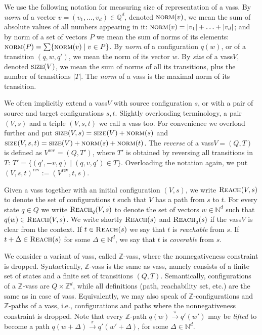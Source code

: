 \documentclass[a4paper, UKenglish, cleveref, autoref, thm-restate]{lipics-v2021}
\newcommand{\N}{\mathbb{N}}
\newcommand{\Z}{\mathbb{Z}}
\newcommand{\Q}{\mathbb{Q}}
\newcommand{\set}[1]{\{#1\}}
\newcommand{\setof}[2]{\set{#1 \mid #2}}
\newcommand{\card}[1]{\left|#1\right|}
\newcommand{\reach}{\textsc{Reach}}
\newcommand{\trans}[1]{\stackrel{#1}{\longrightarrow}}
\newcommand{\norm}{\textsc{norm}}
\newcommand{\size}{\textsc{size}}
\newcommand{\vass}{{\sc vass}\xspace}
\newcommand{\zvass}{$\Z$-{\sc vass}\xspace}
\newcommand{\rev}[1]{{#1}^{\text{rev}}}
\newcommand{\absv}[1]{|#1|}
\begin{document}
We use the following notation for measuring size of representation of a \vass.
By \emph{norm} of a vector $v=(v_1, \ldots, v_d) \in \Q^d$, denoted $\norm(v)$, 
we mean the sum of absolute values of all numbers appearing in it:
$\norm(v) = \absv{v_1} + \ldots + \absv{v_d}$; and 
by norm of a set of vectors $P$ we mean the sum of norms of its elements:
$\norm(P) = \sum\setof{\norm(v)}{v\in P}$. 
By \emph{norm} of a configuration $q(w)$, or of a transition $(q, w, q')$,
we mean the norm of its vector $w$.
By \emph{size} of a \vass $V$, denoted $\size(V)$, we mean
the sum of norms of all its transitions, 
plus the number of transitions $\card T$.
The \emph{norm} of a \vass is the maximal norm of its transition.


We often implicitly extend a \vass $V$ with source configuration $s$, or with
a pair of source and target configurations $s, t$.
Slightly overloading terminology, a pair $(V, s)$ and a triple $(V, s, t)$ we call a \vass too.
For convenience we overload further and put $\size(V,s) = \size(V) + \norm(s)$ and 
$\size(V, s, t) = \size(V) + \norm(s) + \norm(t)$.
The \emph{reverse} of a \vass $V = (Q, T)$ is defined as $\rev V = (Q, T')$,
where $T'$ is obtained by reversing all transitions in $T$:
$T' = \setof{(q', -v, q)}{(q,v,q')\in T}$.
Overloading the notation again, we put $\rev{(V, s, t)} := (\rev V, t, s)$.

Given a \vass together with an initial configuration $(V, s)$, we write 
$\reach(V,s)$ to denote the set of configurations $t$ such that $V$ has a path from $s$ to $t$.
For every state $q\in Q$ we write $\reach_q(V,s)$ to denote the
set of vectors $w\in\N^d$ such that $q(w) \in \reach(V,s)$.
We write shortly $\reach(s)$ and $\reach_q(s)$ if the \vass $V$
is clear from the context.
If $t\in\reach(s)$ we say that $t$ is \emph{reachable} from $s$.
If $t+\Delta\in\reach(s)$ for some $\Delta\in\N^d$, we say that $t$ is \emph{coverable} from $s$.

We consider a variant of \vass, called \zvass, where the nonnegativeness constraint is dropped.
Syntactically, \zvass is the same as \vass, namely consists of a finite set of states and a finite set of transitions
$(Q, T)$. 
Semantically, configurations of a \zvass are $Q \times \Z^d$, while
all definitions (path, reachability set, etc.) are the same as in case of \vass.
Equivalently, we may also speak of $\Z$-configurations and $\Z$-paths of a \vass, i.e., 
configurations and paths where the nonnegativeness constraint is dropped.
Note that every $\Z$-path $q(w) \trans{\pi} q'(w')$ may be \emph{lifted} to become a path
$q(w+\Delta) \trans{\pi} q'(w'+\Delta)$, for some $\Delta \in \N^d$.
\end{document}
